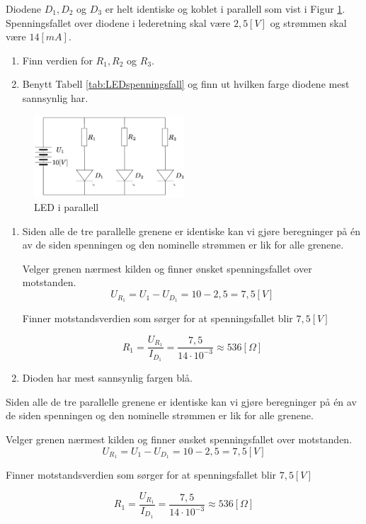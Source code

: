 \begin{question}[name=Oppgave, topic=LEDdioder]
Diodene $D_1,D_2$ og $D_3$ er helt identiske og koblet i parallell som vist i Figur \ref{fig:LEDpara}. Spenningsfallet over diodene i lederetning skal være $2,5[V]$ og strømmen skal være $14 [mA]$.


\begin{enumerate}[label=\roman*)]
	\item Finn verdien for $R_1, R_2$ og $R_3$.
	\item Benytt Tabell \ref{tab:LEDspenningsfall} og finn ut hvilken farge diodene mest sannsynlig har.
\end{enumerate}


	\begin{figure}[H]
	\centering
	\includegraphics[width=0.5\textwidth]{diode/figurer/LEDparallell.png}
	\caption{LED i parallell}
	\label{fig:LEDpara}
\end{figure}
\end{question}

\vspace{0.5cm} %

\begin{solution}[name=Løsningsforslag oppgave]
	\begin{enumerate}[label=\roman*)]
		\item Siden alle de tre parallelle grenene er identiske kan vi gjøre beregninger på én av de siden spenningen og den nominelle strømmen er lik for alle grenene.
		
		Velger grenen nærmest kilden og finner ønsket spenningsfallet over motstanden.
		\[U_{R_{1}}=U_1-U_{D_{1}}=10-2,5=7,5 [V]\]
		
		Finner motstandsverdien som sørger for at spenningsfallet blir $7,5 [V]$
		
		\[R_1=\frac{U_{R_{1}}}{I_{D_{1}}}=\frac{7,5}{14 \cdot 10^{-3}} \approx 536 [\Omega] \]
		\item Dioden har mest sannsynlig fargen blå.
	\end{enumerate}
	
	
Siden alle de tre parallelle grenene er identiske kan vi gjøre beregninger på én av de siden spenningen og den nominelle strømmen er lik for alle grenene.

Velger grenen nærmest kilden og finner ønsket spenningsfallet over motstanden.
\[U_{R_{1}}=U_1-U_{D_{1}}=10-2,5=7,5 [V]\]

Finner motstandsverdien som sørger for at spenningsfallet blir $7,5 [V]$

\[R_1=\frac{U_{R_{1}}}{I_{D_{1}}}=\frac{7,5}{14 \cdot 10^{-3}} \approx 536 [\Omega] \]
	
\end{solution}
\vspace{0.5cm} %


